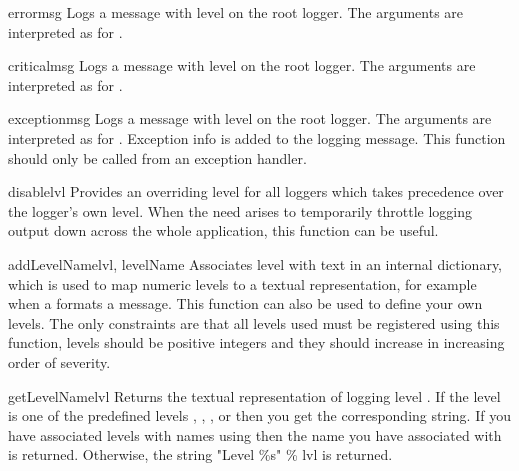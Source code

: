\begin{funcdesc}{error}{msg}
Logs a message with level  on the root logger.
The arguments are interpreted as for .
\end{funcdesc}

\begin{funcdesc}{critical}{msg}
Logs a message with level  on the root logger.
The arguments are interpreted as for .
\end{funcdesc}

\begin{funcdesc}{exception}{msg}
Logs a message with level  on the root logger.
The arguments are interpreted as for . Exception info
is added to the logging message. This function should only be called
from an exception handler.
\end{funcdesc}

\begin{funcdesc}{disable}{lvl}
Provides an overriding level  for all loggers which takes
precedence over the logger's own level. When the need arises to
temporarily throttle logging output down across the whole application,
this function can be useful.
\end{funcdesc}

\begin{funcdesc}{addLevelName}{lvl, levelName}
Associates level  with text  in an internal
dictionary, which is used to map numeric levels to a textual
representation, for example when a  formats a message.
This function can also be used to define your own levels. The only
constraints are that all levels used must be registered using this
function, levels should be positive integers and they should increase
in increasing order of severity.
\end{funcdesc}

\begin{funcdesc}{getLevelName}{lvl}
Returns the textual representation of logging level . If the
level is one of the predefined levels ,
, ,  or 
then you get the corresponding string. If you have associated levels
with names using  then the name you have associated
with  is returned. Otherwise, the string "Level \%s" \% lvl is
returned.
\end{funcdesc}

